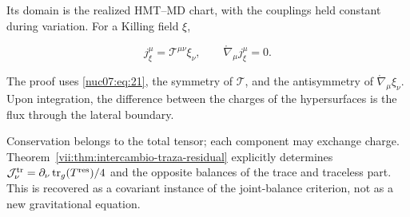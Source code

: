 Its domain is the realized HMT–MD chart, with the couplings held constant during variation. For a Killing field \(\xi\),

\begin{equation}
j^\mu_\xi=\mathcal T^{\mu\nu}\xi_\nu,\qquad
\mathring\nabla_\mu j^\mu_\xi=0.
\label{nuc07:eq:22}
\end{equation}

The proof uses \eqref{nuc07:eq:21}, the symmetry of \(\mathcal T\), and the antisymmetry of \(\mathring\nabla_\mu\xi_\nu\). Upon integration, the difference between the charges of the hypersurfaces is the flux through the lateral boundary.

Conservation belongs to the total tensor; each component may exchange charge. Theorem~\ref{vii:thm:intercambio-traza-residual} explicitly determines \(\mathcal J^{\rm tr}_\nu=\partial_\nu\operatorname{tr}_g(T^{\rm res})/4\) and the opposite balances of the trace and traceless part. This is recovered as a covariant instance of the joint-balance criterion, not as a new gravitational equation.
